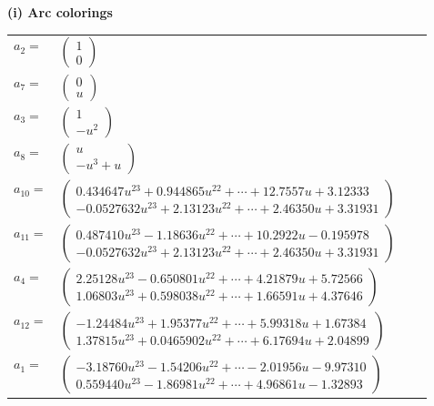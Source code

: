 \documentclass[1p]{elsarticle_modified}
\theoremstyle{definition}
\begin{document}
\flushleft \textbf{(i) Arc colorings}\\
\begin{tabular}{m{7pt} m{180pt} m{7pt} m{180pt} }
\flushright $a_{2}=$&$\begin{pmatrix}1\\0\end{pmatrix}$ \\
\flushright $a_{7}=$&$\begin{pmatrix}0\\u\end{pmatrix}$ \\
\flushright $a_{3}=$&$\begin{pmatrix}1\\- u^2\end{pmatrix}$ \\
\flushright $a_{8}=$&$\begin{pmatrix}u\\- u^3+u\end{pmatrix}$ \\
\flushright $a_{10}=$&$\begin{pmatrix}0.434647 u^{23}+0.944865 u^{22}+\cdots+12.7557 u+3.12333\\-0.0527632 u^{23}+2.13123 u^{22}+\cdots+2.46350 u+3.31931\end{pmatrix}$ \\
\flushright $a_{11}=$&$\begin{pmatrix}0.487410 u^{23}-1.18636 u^{22}+\cdots+10.2922 u-0.195978\\-0.0527632 u^{23}+2.13123 u^{22}+\cdots+2.46350 u+3.31931\end{pmatrix}$ \\
\flushright $a_{4}=$&$\begin{pmatrix}2.25128 u^{23}-0.650801 u^{22}+\cdots+4.21879 u+5.72566\\1.06803 u^{23}+0.598038 u^{22}+\cdots+1.66591 u+4.37646\end{pmatrix}$ \\
\flushright $a_{12}=$&$\begin{pmatrix}-1.24484 u^{23}+1.95377 u^{22}+\cdots+5.99318 u+1.67384\\1.37815 u^{23}+0.0465902 u^{22}+\cdots+6.17694 u+2.04899\end{pmatrix}$ \\
\flushright $a_{1}=$&$\begin{pmatrix}-3.18760 u^{23}-1.54206 u^{22}+\cdots-2.01956 u-9.97310\\0.559440 u^{23}-1.86981 u^{22}+\cdots+4.96861 u-1.32893\end{pmatrix}$ \\

\end{tabular}
\end{document}
